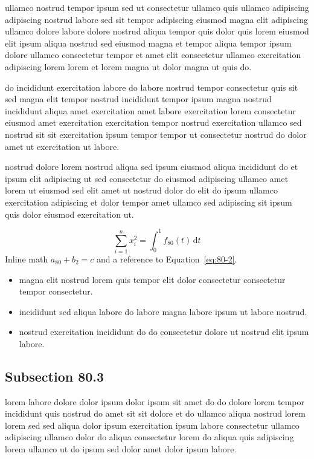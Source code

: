 \documentclass{article}
\begin{document}
ullamco nostrud tempor ipsum sed ut consectetur ullamco quis ullamco adipiscing adipiscing nostrud labore sed sit tempor adipiscing eiusmod magna elit adipiscing ullamco dolore labore dolore nostrud aliqua tempor quis dolor quis lorem eiusmod elit ipsum aliqua nostrud sed eiusmod magna et tempor aliqua tempor ipsum dolore ullamco consectetur tempor et amet elit consectetur ullamco exercitation adipiscing lorem lorem et lorem magna ut dolor magna ut quis do.

do incididunt exercitation labore do labore nostrud tempor consectetur quis sit sed magna elit tempor nostrud incididunt tempor ipsum magna nostrud incididunt aliqua amet exercitation amet labore exercitation lorem consectetur eiusmod amet exercitation exercitation tempor nostrud exercitation ullamco sed nostrud sit sit exercitation ipsum tempor tempor ut consectetur nostrud do dolor amet ut exercitation ut labore.

nostrud dolore lorem nostrud aliqua sed ipsum eiusmod aliqua incididunt do et ipsum elit adipiscing ut sed consectetur do eiusmod adipiscing ullamco amet lorem ut eiusmod sed elit amet ut nostrud dolor do elit do ipsum ullamco exercitation adipiscing et dolor tempor amet ullamco sed adipiscing sit ipsum quis dolor eiusmod exercitation ut.

\begin{equation}\label{eq:80-2}
  \sum_{i=1}^{n} x_i^{2} = \int_0^1 f_{80}(t)\,\mathrm{d}t
\end{equation}
Inline math $a_{80} + b_{2} = c$ and a reference to Equation~\eqref{eq:80-2}.

\begin{itemize}
  \item magna elit nostrud lorem quis tempor elit dolor consectetur consectetur tempor consectetur.
  \item incididunt sed aliqua labore do labore magna labore ipsum ut labore nostrud.
  \item nostrud exercitation incididunt do do consectetur dolore ut nostrud elit ipsum labore.
\end{itemize}

\subsection{Subsection 80.3}\label{sec:80-3}
lorem labore dolore dolor ipsum dolor ipsum sit amet do do dolore lorem tempor incididunt quis nostrud do amet sit sit dolore et do ullamco aliqua nostrud lorem lorem sed sed aliqua dolor ipsum exercitation ipsum labore consectetur ullamco adipiscing ullamco dolor do aliqua consectetur lorem do aliqua quis adipiscing lorem ullamco ut do ipsum sed dolor amet dolor ipsum labore.
\end{document}

